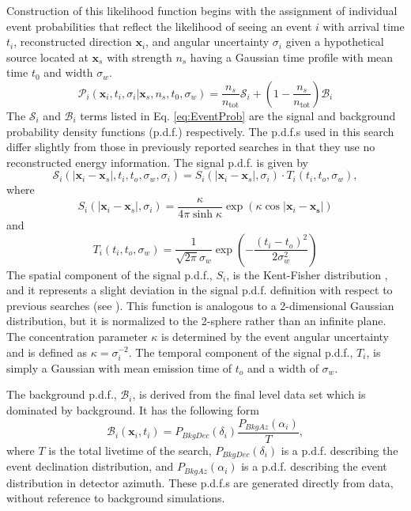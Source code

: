 \documentclass[manuscript]{aastex}
\begin{document}
Construction of this likelihood function begins with the assignment of individual event probabilities that reflect the likelihood of seeing an event $i$ with arrival time $t_i$, reconstructed direction $\mathbf{x}_i$, and angular uncertainty $\sigma_i$ given a hypothetical source located at $\mathbf{x}_s$ with strength $n_s$ having a Gaussian time profile with mean time $t_0$ and width $\sigma_w$.
\begin{equation}\label{eq:EventProb}
\mathcal{P}_i(\mathbf{x}_i,t_i,\sigma_i|\mathbf{x}_s,n_s,t_0,\sigma_w) = \frac{n_s}{n_{\mathrm{tot}}} \mathcal{S}_i + \left(1-\frac{n_s}{n_{\mathrm{tot}}}\right) \mathcal{B}_i
\end{equation}
The $\mathcal{S}_i$ and $\mathcal{B}_i$ terms listed in Eq. \ref{eq:EventProb} are the signal and background probability density functions (p.d.f.) respectively. The p.d.f.s used in this search differ slightly from those in previously reported searches in that they use no reconstructed energy information. The signal p.d.f. is given by
\begin{equation}
\mathcal{S}_i(|\mathbf{x}_i-\mathbf{x}_s|,t_i,t_o,\sigma_w,\sigma_i) = S_i(|\mathbf{x}_i-\mathbf{x}_s|,\sigma_i) \cdot T_i(t_i,t_o,\sigma_w),
\end{equation}
where 
\begin{equation}
S_i(|\mathbf{x}_i-\mathbf{x}_s|,\sigma_i) = \frac{\kappa}{4\pi \sinh \kappa} \exp \left(\kappa \cos |\mathbf{x}_i-\mathbf{x_s}|\right)
\end{equation}
and
\begin{equation}
T_i(t_i,t_o,\sigma_w) = \frac{1}{\sqrt{2\pi}\sigma_w} \exp \left(-\frac{(t_i-t_o)^2}{2 \sigma_w^2}\right)
\end{equation}
The spatial component of the signal p.d.f., $S_i$, is the Kent-Fisher distribution \citep{Fisher_Bingham}, and it represents a slight deviation in the signal p.d.f. definition with respect to previous searches (see \cite{2014ApJ...796..109A}). This function is analogous to a 2-dimensional Gaussian distribution, but it is normalized to the 2-sphere rather than an infinite plane. The concentration parameter $\kappa$ is determined by the event angular uncertainty and is defined as $\kappa = \sigma_{i}^{-2}$. The temporal component of the signal p.d.f., $T_i$, is simply a Gaussian with mean emission time of $t_o$ and a width of $\sigma_w$.

The background p.d.f., $\mathcal{B}_i$, is derived from the final level data set which is dominated by background. It has the following form
\begin{equation}
\mathcal{B}_i(\mathbf{x}_i,t_i) = P_{BkgDec}(\delta_i)\frac{P_{BkgAz}(\alpha_i)}{T},
\end{equation}
where $T$ is the total livetime of the search, $P_{BkgDec}(\delta_i)$ is a p.d.f. describing the event declination distribution, and $P_{BkgAz}(\alpha_i)$ is a p.d.f. describing the event distribution in detector azimuth. These p.d.f.s are generated directly from data, without reference to background simulations.
\end{document}
